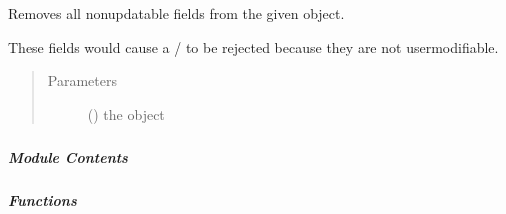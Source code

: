 \documentclass[letterpaper,10pt,english]{sphinxmanual}
\begin{document}
\begin{fulllineitems}
\label{\detokenize{autoapi/pine/client/models/index:pine.client.models.remove_nonupdatable_fields}}
Removes all non\sphinxhyphen{}updatable fields from the given object.

These fields would cause a / to be rejected because they are not user\sphinxhyphen{}modifiable.
\begin{quote}\begin{description}
\item[{Parameters}] \leavevmode
{} () \textendash{} the object

\end{description}\end{quote}

\end{fulllineitems}



\subparagraph{}
\label{\detokenize{autoapi/pine/client/password/index:module-pine.client.password}}\label{\detokenize{autoapi/pine/client/password/index:pine-client-password}}\label{\detokenize{autoapi/pine/client/password/index::doc}}

\subparagraph{Module Contents}
\label{\detokenize{autoapi/pine/client/password/index:module-contents}}

\subparagraph{Functions}
\label{\detokenize{autoapi/pine/client/password/index:functions}}
\end{document}
